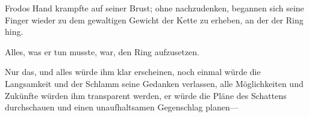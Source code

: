 Frodos Hand krampfte auf seiner Brust; ohne nachzudenken, begannen sich seine Finger wieder zu dem gewaltigen Gewicht der Kette zu erheben, an der der Ring hing.

Alles, was er tun musste, war, den Ring aufzusetzen.

Nur das, und alles würde ihm klar erscheinen, noch einmal würde die Langsamkeit und der Schlamm seine Gedanken verlassen, alle Möglichkeiten und Zukünfte würden ihm transparent werden, er würde die Pläne des Schattens durchschauen und einen unaufhaltsamen Gegenschlag planen—

